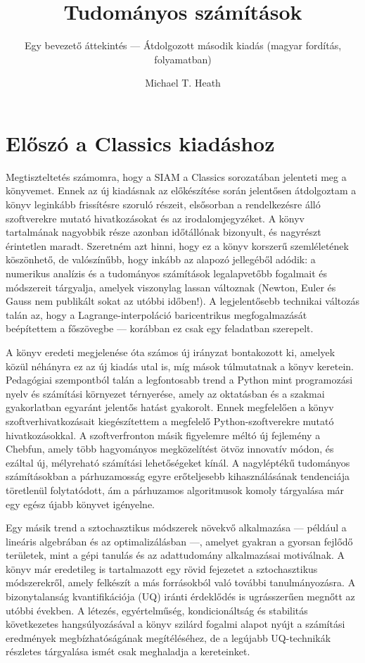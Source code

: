 \documentclass[
  magyar,
  11pt]{article}
\title{Tudományos számítások}
\subtitle{Egy bevezető áttekintés --- Átdolgozott második kiadás (magyar
fordítás, folyamatban)}
\author{Michael T. Heath}
\date{}
\begin{document}
\maketitle

{
\setcounter{tocdepth}{3}
\tableofcontents
}
\section{Előszó a Classics
kiadáshoz}\label{elux151szuxf3-a-classics-kiaduxe1shoz}

Megtiszteltetés számomra, hogy a SIAM a Classics sorozatában jelenteti
meg a könyvemet. Ennek az új kiadásnak az előkészítése során jelentősen
átdolgoztam a könyv leginkább frissítésre szoruló részeit, elsősorban a
rendelkezésre álló szoftverekre mutató hivatkozásokat és az
irodalomjegyzéket. A könyv tartalmának nagyobbik része azonban
időtállónak bizonyult, és nagyrészt érintetlen maradt. Szeretném azt
hinni, hogy ez a könyv korszerű szemléletének köszönhető, de
valószínűbb, hogy inkább az alapozó jellegéből adódik: a numerikus
analízis és a tudományos számítások legalapvetőbb fogalmait és
módszereit tárgyalja, amelyek viszonylag lassan változnak (Newton, Euler
és Gauss nem publikált sokat az utóbbi időben!). A legjelentősebb
technikai változás talán az, hogy a Lagrange-interpoláció baricentrikus
megfogalmazását beépítettem a főszövegbe --- korábban ez csak egy
feladatban szerepelt.

A könyv eredeti megjelenése óta számos új irányzat bontakozott ki,
amelyek közül néhányra ez az új kiadás utal is, míg mások túlmutatnak a
könyv keretein. Pedagógiai szempontból talán a legfontosabb trend a
Python mint programozási nyelv és számítási környezet térnyerése, amely
az oktatásban és a szakmai gyakorlatban egyaránt jelentős hatást
gyakorolt. Ennek megfelelően a könyv szoftverhivatkozásait
kiegészítettem a megfelelő Python-szoftverekre mutató hivatkozásokkal. A
szoftverfronton másik figyelemre méltó új fejlemény a Chebfun, amely
több hagyományos megközelítést ötvöz innovatív módon, és ezáltal új,
mélyreható számítási lehetőségeket kínál. A nagyléptékű tudományos
számításokban a párhuzamosság egyre erőteljesebb kihasználásának
tendenciája töretlenül folytatódott, ám a párhuzamos algoritmusok komoly
tárgyalása már egy egész újabb könyvet igényelne.

Egy másik trend a sztochasztikus módszerek növekvő alkalmazása ---
például a lineáris algebrában és az optimalizálásban ---, amelyet
gyakran a gyorsan fejlődő területek, mint a gépi tanulás és az
adattudomány alkalmazásai motiválnak. A könyv már eredetileg is
tartalmazott egy rövid fejezetet a sztochasztikus módszerekről, amely
felkészít a más forrásokból való további tanulmányozásra. A
bizonytalanság kvantifikációja (UQ) iránti érdeklődés is ugrásszerűen
megnőtt az utóbbi években. A létezés, egyértelműség, kondicionáltság és
stabilitás következetes hangsúlyozásával a könyv szilárd fogalmi alapot
nyújt a számítási eredmények megbízhatóságának megítéléséhez, de a
legújabb UQ-technikák részletes tárgyalása ismét csak meghaladja a
kereteinket.
\end{document}
